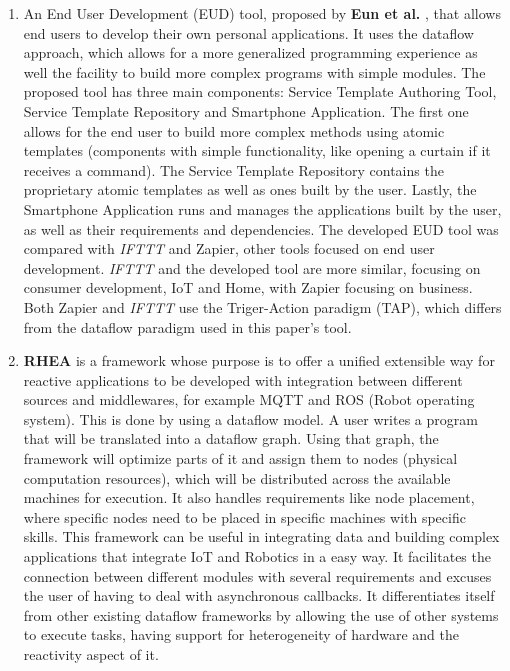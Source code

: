 \begin{enumerate}
    \item An End User Development (EUD) tool, proposed by \textbf{Eun et al.} \cite{eud_platform}, that allows end users to develop their own personal applications. It uses the dataflow approach, which allows for a more generalized programming experience as well the facility to build more complex programs with simple modules. The proposed tool has three main components: Service Template Authoring Tool, Service Template Repository and Smartphone Application. The first one allows for the end user to build more complex methods using atomic templates (components with simple functionality, like opening a curtain if it receives a command). The Service Template Repository contains the proprietary atomic templates as well as ones built by the user. Lastly, the Smartphone Application runs and manages the applications built by the user, as well as their requirements and dependencies. The developed EUD tool was compared with \textit{IFTTT} and Zapier, other tools focused on end user development. \textit{IFTTT} and the developed tool are more similar, focusing on consumer development, IoT and Home, with Zapier focusing on business. Both Zapier and \textit{IFTTT} use the Triger-Action paradigm (TAP), which differs from the dataflow paradigm used in this paper's tool.
    \item \textbf{RHEA} \cite{rhea} is a framework whose purpose is to offer a unified extensible way for reactive applications to be developed with integration between different sources and middlewares, for example MQTT and ROS (Robot operating system). This is done by using a dataflow model. A user writes a program that will be translated into a dataflow graph. Using that graph, the framework will optimize parts of it and assign them to nodes (physical computation resources), which will be distributed across the available machines for execution. It also handles requirements like node placement, where specific nodes need to be placed in specific machines with specific skills. This framework can be useful in integrating data and building complex applications that integrate IoT and Robotics in a easy way. It facilitates the connection between different modules with several requirements and excuses the user of having to deal with asynchronous callbacks. It differentiates itself from other existing dataflow frameworks by allowing the use of other systems to execute tasks, having support for heterogeneity of hardware and the reactivity aspect of it.
\end{enumerate}

